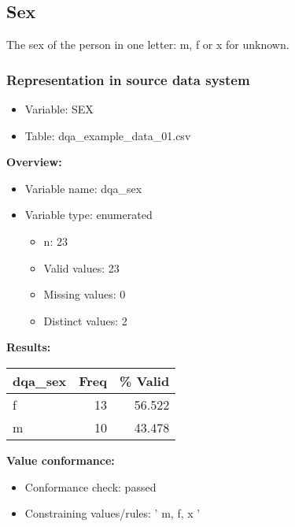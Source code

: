 \documentclass[
]{article}
\providecommand{\tightlist}{%
  \setlength{\itemsep}{0pt}\setlength{\parskip}{0pt}}
\begin{document}
\hypertarget{sex}{%
\subsection{Sex}\label{sex}}

The sex of the person in one letter: m, f or x for unknown.

\hypertarget{representation-in-source-data-system-11}{%
\subsubsection{\texorpdfstring{Representation in \textbf{source} data
system}{Representation in source data system}}\label{representation-in-source-data-system-11}}

\begin{itemize}
\tightlist
\item
  Variable: SEX
\item
  Table: dqa\_example\_data\_01.csv
\end{itemize}

\textbf{Overview:}

\begin{itemize}
\tightlist
\item
  Variable name: dqa\_sex
\item
  Variable type: enumerated

  \begin{itemize}
  \tightlist
  \item
    n: 23
  \item
    Valid values: 23
  \item
    Missing values: 0
  \item
    Distinct values: 2
  \end{itemize}
\end{itemize}

\textbf{Results:}\\

\begin{table}[H]
\centering
\begin{tabular}{l|r|r}
\hline
\textbf{dqa\_sex} & \textbf{Freq} & \textbf{\% Valid}\\
\hline
f & 13 & 56.522\\
\hline
m & 10 & 43.478\\
\hline
\end{tabular}
\end{table}

\textbf{Value conformance:}

\begin{itemize}
\tightlist
\item
  Conformance check: passed
\item
  Constraining values/rules: ' m, f, x '
\end{itemize}
\end{document}
